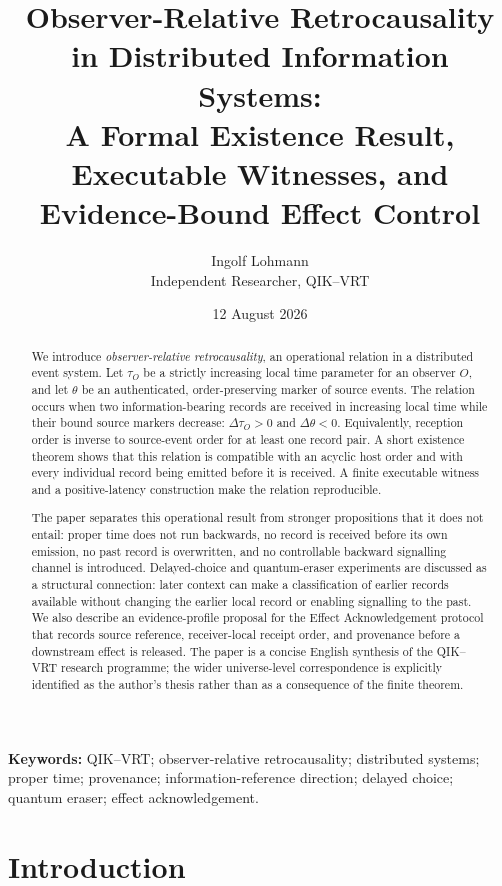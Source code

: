 \documentclass[11pt]{article}
\title{Observer-Relative Retrocausality in Distributed Information Systems:\\
\large A Formal Existence Result, Executable Witnesses, and Evidence-Bound Effect Control}
\author{Ingolf Lohmann\\
Independent Researcher, QIK--VRT}
\date{12 August 2026}
\theoremstyle{remark}
\begin{document}
\maketitle

\begin{abstract}
We introduce \emph{observer-relative retrocausality}, an operational relation
in a distributed event system. Let $\tau_O$ be a strictly increasing local
time parameter for an observer $O$, and let $\theta$ be an authenticated,
order-preserving marker of source events. The relation occurs when two
information-bearing records are received in increasing local time while their
bound source markers decrease: $\Delta\tau_O>0$ and $\Delta\theta<0$.
Equivalently, reception order is inverse to source-event order for at least one
record pair. A short existence theorem shows that this relation is compatible
with an acyclic host order and with every individual record being emitted
before it is received. A finite executable witness and a positive-latency
construction make the relation reproducible.

The paper separates this operational result from stronger propositions that it
does not entail: proper time does not run backwards, no record is received
before its own emission, no past record is overwritten, and no controllable
backward signalling channel is introduced. Delayed-choice and quantum-eraser
experiments are discussed as a structural connection: later context can make a
classification of earlier records available without changing the earlier local
record or enabling signalling to the past. We also describe an evidence-profile
proposal for the Effect Acknowledgement protocol that records source reference,
receiver-local receipt order, and provenance before a downstream effect is
released. The paper is a concise English synthesis of the QIK--VRT research
programme; the wider universe-level correspondence is explicitly identified as
the author's thesis rather than as a consequence of the finite theorem.
\end{abstract}

\noindent\textbf{Keywords:} QIK--VRT; observer-relative retrocausality;
distributed systems; proper time; provenance; information-reference direction;
delayed choice; quantum eraser; effect acknowledgement.

\section{Introduction}
\label{sec:introduction}
\end{document}
